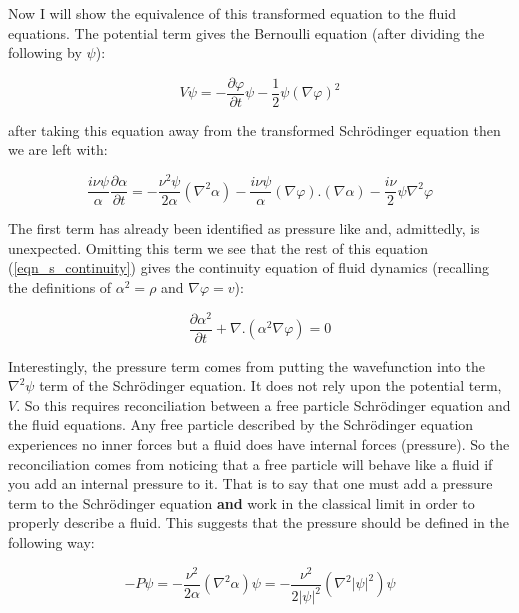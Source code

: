 Now I will show the equivalence of this transformed equation to the fluid equations. The potential term gives the Bernoulli equation (after dividing the following by $\psi$):

\begin{equation}
\label{eqn_bernoulli}
 V\psi = -\frac{\partial\varphi}{\partial t}\psi - \frac{1}{2}\psi(\nabla\varphi)^2
\end{equation}

\noindent after taking this equation away from the transformed Schr\"odinger equation then we are left with:

\begin{equation}
\label{eqn_s_continuity}
\frac{i\nu\psi}{\alpha}\frac{\partial\alpha}{\partial t} = -\frac{\nu^2\psi}{2\alpha}(\nabla^2\alpha) -\frac{i\nu\psi}{\alpha}(\nabla\varphi).(\nabla\alpha) -\frac{i\nu}{2}\psi\nabla^2\varphi
\end{equation}

\noindent The first term has already been identified as pressure like and, admittedly, is unexpected. Omitting this term we see that the rest of this equation (\ref{eqn_s_continuity}) gives the continuity equation of fluid dynamics (recalling the definitions of $\alpha^2 = \rho$ and $\nabla \varphi = v$):

\begin{equation}
\frac{\partial\alpha^2}{\partial t} + \nabla . (\alpha^2\nabla\varphi)= 0
\end{equation}

\noindent Interestingly, the pressure term comes from putting the wavefunction into the $\nabla^2 \psi$ term of the Schr\"odinger equation. It does not rely upon the potential term, $V$. So this requires reconciliation between a free particle Schr\"odinger equation and the fluid equations. Any free particle described by the Schr\"odinger equation experiences no inner forces but a fluid does have internal forces (pressure). So the reconciliation comes from noticing that a free particle will behave like a fluid if you add an internal pressure to it. That is to say that one must add a pressure term to the Schr\"odinger equation {\bf and} work in the classical limit in order to properly describe a fluid. This suggests that the pressure should be defined in the following way:

\begin{equation}
\label{eqn_pressure}
-P\psi = -\frac{\nu^2}{2\alpha}(\nabla^2\alpha)\psi = -\frac{\nu^2}{2|\psi|^2}(\nabla^2|\psi|^2)\psi
\end{equation}

